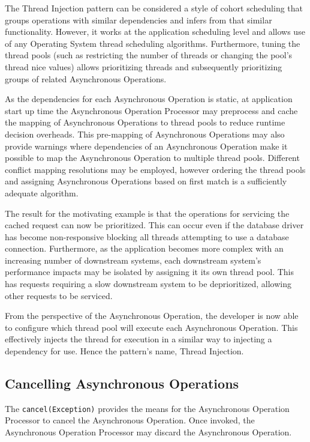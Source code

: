 \documentclass[prodmode]{style/acmlarge}
\begin{document}
The Thread Injection pattern can be considered a style of cohort scheduling
\cite{cohort} that groups operations with similar dependencies and infers from
that similar functionality.  However, it works at the application scheduling
level and allows use of any Operating System thread scheduling algorithms. 
Furthermore, tuning the thread pools (such as restricting the number of threads
or changing the pool's thread nice values) allows prioritizing threads and
subsequently prioritizing groups of related Asynchronous Operations.

As the dependencies for each Asynchronous Operation is static, at application
start up time the Asynchronous Operation Processor may preprocess and cache the
mapping of Asynchronous Operations to thread pools to reduce runtime decision
overheads.  This pre-mapping of Asynchronous Operations may also provide
warnings where dependencies of an Asynchronous Operation make it possible to map
the Asynchronous Operation to multiple thread pools.  Different conflict
mapping resolutions may be employed, however ordering the thread pools and
assigning Asynchronous Operations based on first match is a sufficiently
adequate algorithm.

The result for the motivating example is that the operations for servicing the
cached request can now be prioritized.  This can occur even if the database
driver has become non-responsive blocking all threads attempting to use a
database connection.  Furthermore, as the application becomes more complex with
an increasing number of downstream systems, each downstream system's performance
impacts may be isolated by assigning it its own thread pool.  This has requests
requiring a slow downstream system to be deprioritized, allowing other requests
to be serviced.

From the perspective of the Asynchronous Operation, the developer is now able to
configure which thread pool will execute each Asynchronous Operation.  This
effectively injects the thread for execution in a similar way to injecting a
dependency for use.  Hence the pattern's name, Thread Injection.


\subsection{Cancelling Asynchronous Operations}

The \texttt{cancel(Exception)} provides the means for the Asynchronous Operation
Processor to cancel the Asynchronous Operation.  Once invoked, the Asynchronous
Operation Processor may discard the Asynchronous Operation.
\end{document}

